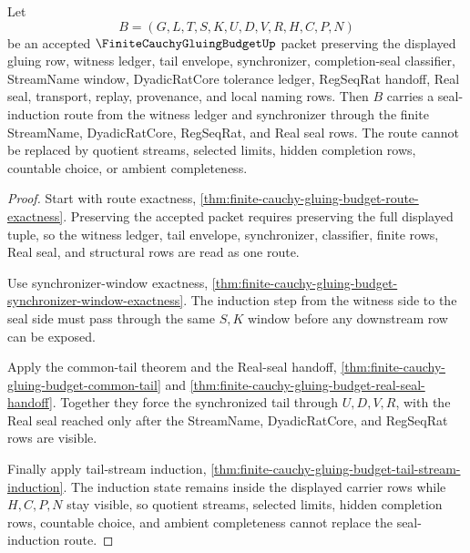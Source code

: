 \begin{theorem}
\label{thm:finite-cauchy-gluing-budget-seal-induction-route}
Let
$$
B=(G,L,T,S,K,U,D,V,R,H,C,P,N)
$$
be an accepted $\FiniteCauchyGluingBudgetUp$ packet preserving the displayed gluing row, witness ledger, tail envelope, synchronizer, completion-seal classifier, StreamName window, DyadicRatCore tolerance ledger, RegSeqRat handoff, Real seal, transport, replay, provenance, and local naming rows. Then $B$ carries a seal-induction route from the witness ledger and synchronizer through the finite StreamName, DyadicRatCore, RegSeqRat, and Real seal rows. The route cannot be replaced by quotient streams, selected limits, hidden completion rows, countable choice, or ambient completeness.
\end{theorem}
\begin{proof}
Start with route exactness, \autoref{thm:finite-cauchy-gluing-budget-route-exactness}. Preserving the accepted packet requires preserving the full displayed tuple, so the witness ledger, tail envelope, synchronizer, classifier, finite rows, Real seal, and structural rows are read as one route.

Use synchronizer-window exactness, \autoref{thm:finite-cauchy-gluing-budget-synchronizer-window-exactness}. The induction step from the witness side to the seal side must pass through the same $S,K$ window before any downstream row can be exposed.

Apply the common-tail theorem and the Real-seal handoff, \autoref{thm:finite-cauchy-gluing-budget-common-tail} and \autoref{thm:finite-cauchy-gluing-budget-real-seal-handoff}. Together they force the synchronized tail through $U,D,V,R$, with the Real seal reached only after the StreamName, DyadicRatCore, and RegSeqRat rows are visible.

Finally apply tail-stream induction, \autoref{thm:finite-cauchy-gluing-budget-tail-stream-induction}. The induction state remains inside the displayed carrier rows while $H,C,P,N$ stay visible, so quotient streams, selected limits, hidden completion rows, countable choice, and ambient completeness cannot replace the seal-induction route.
\end{proof}

